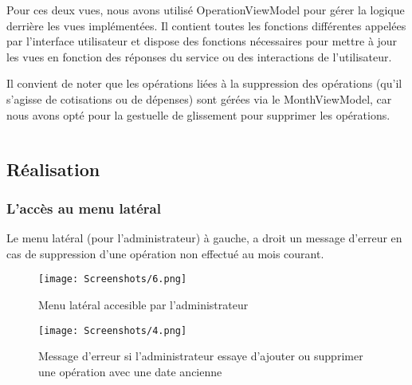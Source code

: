 Pour ces deux vues, nous avons utilisé OperationViewModel pour gérer la logique derrière les vues implémentées. Il contient toutes les fonctions différentes appelées par l'interface utilisateur et dispose des fonctions nécessaires pour mettre à jour les vues en fonction des réponses du service ou des interactions de l'utilisateur.

Il convient de noter que les opérations liées à la suppression des opérations (qu'il s'agisse de cotisations ou de dépenses) sont gérées via le MonthViewModel, car nous avons opté pour la gestuelle de glissement pour supprimer les opérations.

$ $
\newpage
\subsection{Réalisation}
\subsubsection{L'accès au menu latéral} 
Le menu latéral (pour l'administrateur) à gauche, a droit un message d'erreur en cas de suppression d'une opération non effectué au mois courant.

\begin{figure}[!htbp]
  \begin{minipage}[t]{0.4\textwidth}    %
          \texttt{[image: Screenshots/6.png]}
          \caption{ Menu latéral accesible par l'administrateur}
  \end{minipage}%
  \begin{minipage}{0.20\textwidth}
    \hfill
  \end{minipage}
\begin{minipage}[t]{0.4\textwidth}
        \texttt{[image: Screenshots/4.png]}
        \caption{ Message d'erreur si l'administrateur essaye d'ajouter ou supprimer une opération avec une date ancienne}
  \end{minipage}%
\end{figure}
$ $
